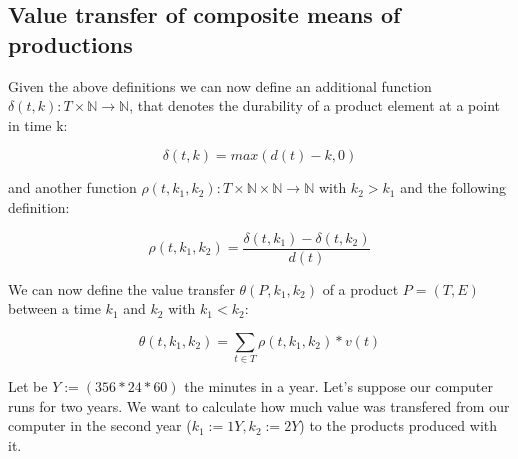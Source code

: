\documentclass[11pt]{article}
\begin{document}
\subsection{Value transfer of composite means of productions}

Given the above definitions we can now define an additional function $\delta(t, k) : T \times \mathbb{N} \rightarrow \mathbb{N}$, that denotes the durability of a product element at a point in time k:

\begin{equation}
\delta(t, k) = max(d(t) - k, 0)
\end{equation}

and another function $\rho(t, k_1, k_2): T \times \mathbb{N} \times \mathbb{N} \rightarrow \mathbb{N}$ with $k_2 > k_1$ and the following definition:

\begin{equation}
\rho(t, k_1, k_2) = \frac{\delta(t, k_1) - \delta(t, k_2)}{d(t)}
\end{equation}

We can now define the value transfer $\theta(P, k_1, k_2)$ of a product $P=(T, E)$ between a time $k_1$ and $k_2$ with $k_1 < k_2$:

\begin{equation}
\theta(t, k_1, k_2) = \sum_{t \in T} \rho(t, k_1, k_2) * v(t)
\end{equation}

Let be $Y := (356*24*60)$ the minutes in a year. Let's suppose our computer runs for two years. We want to calculate how much value was transfered from our computer in the second year ($k_1 := 1Y, k_2 := 2Y$) to the products produced with it.
\end{document}
